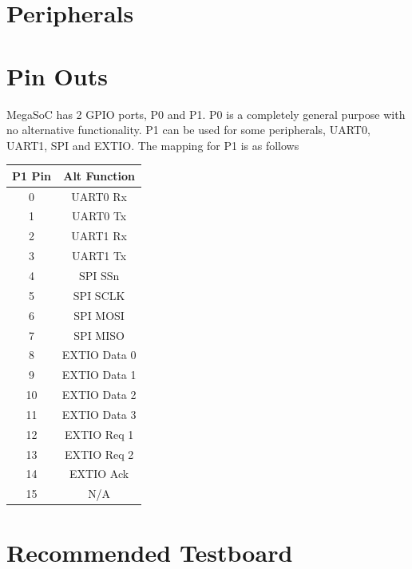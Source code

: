 \documentclass{report}
\begin{document}
\section{}


\chapter{Peripherals} \label{peripherals} 

\chapter{Pin Outs} \label{pinout}
MegaSoC has 2 GPIO ports, P0 and P1. P0 is a completely general purpose with no
alternative functionality. P1 can be used for some peripherals, UART0, UART1, SPI and EXTIO.
The mapping for P1 is as follows

\begin{center}
    \begin{tabular}{||c | c ||}
        \hline
        P1 Pin & Alt Function \\ 
        \hline\hline
        0 & UART0 Rx \\
        1 & UART0 Tx \\
        2 & UART1 Rx \\
        3 & UART1 Tx \\
        4 & SPI SSn \\
        5 & SPI SCLK \\
        6 & SPI MOSI \\
        7 & SPI MISO \\
        8 & EXTIO Data 0 \\
        9 & EXTIO Data 1 \\
        10 & EXTIO Data 2 \\
        11 & EXTIO Data 3 \\
        12 & EXTIO Req 1 \\
        13 & EXTIO Req 2 \\
        14 & EXTIO Ack \\
        15 & N/A \\
        \hline
    \end{tabular}
\end{center}


\chapter{Recommended Testboard}
\end{document}
